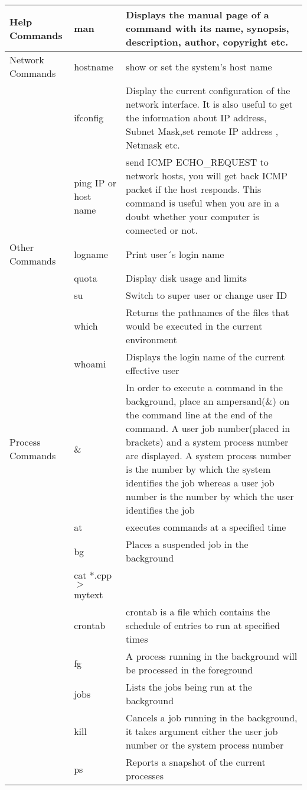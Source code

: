 \begin{tabular}{|p{0.6in}|p{0.7in}|p{2.9in}|}
Help Commands & man & Displays the manual page of a command with its name, synopsis, description, author, copyright etc. \\ \hline
Network Commands & hostname & show or set  the system's host name \\ \hline
& ifconfig & Display the current configuration of the network interface. It is also useful to get the information about IP address, Subnet Mask,set remote IP address , Netmask etc. \\ \hline
& ping IP or host name & send ICMP ECHO\_REQUEST to network hosts, you will get back ICMP packet if the host responds.  This command is useful when you are in a doubt whether your computer is connected or not. \\ \hline
Other Commands & logname & Print user´s login name \\ \hline
& quota & Display disk usage and limits \\ \hline
& su & Switch to super user or change user ID \\ \hline
& which & Returns the pathnames of the files that would be executed in the current environment \\ \hline
& whoami & Displays the login name of the current effective user \\ \hline
Process Commands & \& & In order to execute a command in the background, place an ampersand(\&) on the command line at the end of the command. A user job number(placed in brackets) and a system process number are displayed. A system process number is the number by which the system identifies the job whereas a user job number is the number by which the user identifies the job \\ \hline
& at & executes commands at a specified time \\ \hline
& bg & Places a suspended job in the background \\ \hline
& cat  *.cpp  $>$ mytext &  \\ \hline
& crontab & crontab  is a file which contains the schedule of  entries to run at  specified times \\ \hline
& fg & A process running in the background will be processed in the foreground \\ \hline
& jobs & Lists the jobs being run at the background \\ \hline
& kill & Cancels a job running in the background, it takes argument either the user job number or the system process number \\ \hline
& ps & Reports a snapshot of the current processes \\ \hline

\end{tabular}
